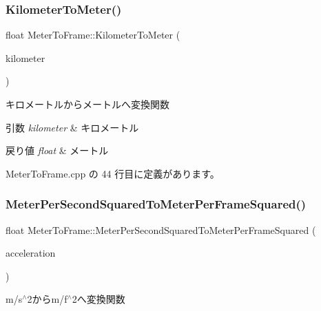 \subsubsection{\texorpdfstring{Kilometer\+To\+Meter()}{KilometerToMeter()}}
{\footnotesize\ttfamily float Meter\+To\+Frame\+::\+Kilometer\+To\+Meter (\begin{DoxyParamCaption}\item[{float}]{kilometer }\end{DoxyParamCaption})\hspace{0.3cm}{\ttfamily [static]}}



キロメートルからメートルへ変換関数 


\begin{DoxyParams}{引数}
{\em kilometer} & キロメートル \\
\hline
\end{DoxyParams}

\begin{DoxyRetVals}{戻り値}
{\em float} & メートル \\
\hline
\end{DoxyRetVals}


 Meter\+To\+Frame.\+cpp の 44 行目に定義があります。

\mbox{\label{class_meter_to_frame_ac3292be31b35e97027a65b4c74763ebe}} 
\subsubsection{\texorpdfstring{Meter\+Per\+Second\+Squared\+To\+Meter\+Per\+Frame\+Squared()}{MeterPerSecondSquaredToMeterPerFrameSquared()}}
{\footnotesize\ttfamily float Meter\+To\+Frame\+::\+Meter\+Per\+Second\+Squared\+To\+Meter\+Per\+Frame\+Squared (\begin{DoxyParamCaption}\item[{float}]{acceleration }\end{DoxyParamCaption})\hspace{0.3cm}{\ttfamily [static]}}



m/s$^\wedge$2からm/f$^\wedge$2へ変換関数 



